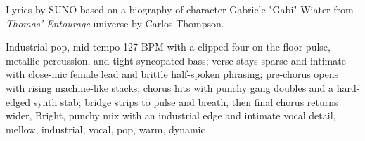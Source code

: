 
\begin{notes}
Lyrics by SUNO based on a biography of character Gabriele "Gabi" Wiater from \emph{Thomas’ Entourage} universe by Carlos Thompson.
\end{notes}
\begin{style}
Industrial pop, mid-tempo 127 BPM with a clipped four-on-the-floor pulse, metallic percussion, and tight syncopated bass; verse stays sparse and intimate with close-mic female lead and brittle half-spoken phrasing; pre-chorus opens with rising machine-like stacks; chorus hits with punchy gang doubles and a hard-edged synth stab; bridge strips to pulse and breath, then final chorus returns wider, Bright, punchy mix with an industrial edge and intimate vocal detail, mellow, industrial, vocal, pop, warm, dynamic
\end{style}
